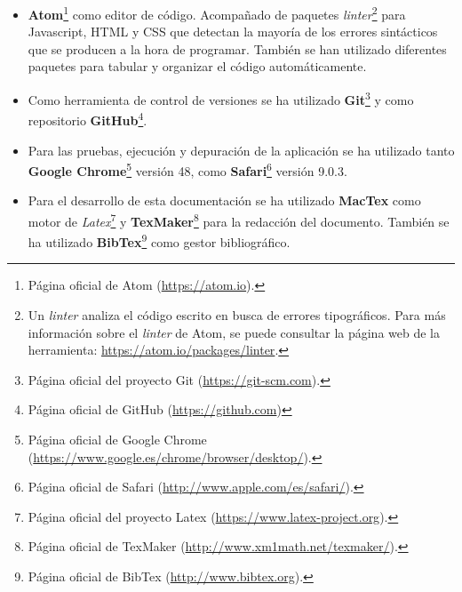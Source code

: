 \begin{itemize}
	\item \textbf{Atom}\footnote{Página oficial de Atom (\url{https://atom.io}).} como editor de código. Acompañado de paquetes \emph{linter}\footnote{Un \emph{linter} analiza el código escrito en busca de errores tipográficos. Para más información sobre el \emph{linter} de Atom, se puede consultar la página web de la herramienta: \url{https://atom.io/packages/linter}.} para Javascript, HTML y CSS que detectan la mayoría de los errores sintácticos que se producen a la hora de programar. También se han utilizado diferentes paquetes para tabular y organizar el código automáticamente. 

	\item Como herramienta de control de versiones se ha utilizado \textbf{Git}\footnote{Página oficial del proyecto Git (\url{https://git-scm.com}).} y como repositorio \textbf{GitHub}\footnote{Página oficial de GitHub (\url{https://github.com})}.
	
	\item Para las pruebas, ejecución y depuración de la aplicación se ha utilizado tanto \textbf{Google Chrome}\footnote{Página oficial de Google Chrome (\url{https://www.google.es/chrome/browser/desktop/}).} versión 48, como \textbf{Safari}\footnote{Página oficial de Safari (\url{http://www.apple.com/es/safari/}).} versión 9.0.3.
	
	\item Para el desarrollo de esta documentación se ha utilizado \textbf{MacTex} como motor de \emph{Latex}\footnote{Página oficial del proyecto Latex (\url{https://www.latex-project.org}).} y \textbf{TexMaker}\footnote{Página oficial de TexMaker (\url{http://www.xm1math.net/texmaker/}).} para la redacción del documento. También se ha utilizado \textbf{BibTex}\footnote{Página oficial de BibTex (\url{http://www.bibtex.org}).} como gestor bibliográfico.
\end{itemize}


